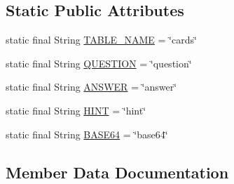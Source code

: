\subsection*{Static Public Attributes}
\begin{DoxyCompactItemize}
\item 
static final String \hyperlink{classorg_1_1buildmlearn_1_1learnwithflashcards_1_1data_1_1FlashContract_1_1FlashCards_a1df683e63de75b46348ae0f509f7b2eb}{T\+A\+B\+L\+E\+\_\+\+N\+A\+ME} = \char`\"{}cards\char`\"{}
\item 
static final String \hyperlink{classorg_1_1buildmlearn_1_1learnwithflashcards_1_1data_1_1FlashContract_1_1FlashCards_abe5a359cab3c3b1a89604497e645b1df}{Q\+U\+E\+S\+T\+I\+ON} = \char`\"{}question\char`\"{}
\item 
static final String \hyperlink{classorg_1_1buildmlearn_1_1learnwithflashcards_1_1data_1_1FlashContract_1_1FlashCards_a3d44587c144dfd28d7d6f1e5b98f499e}{A\+N\+S\+W\+ER} = \char`\"{}answer\char`\"{}
\item 
static final String \hyperlink{classorg_1_1buildmlearn_1_1learnwithflashcards_1_1data_1_1FlashContract_1_1FlashCards_a2c347ee6d0085d7eb67f6d3da8f98d1f}{H\+I\+NT} = \char`\"{}hint\char`\"{}
\item 
static final String \hyperlink{classorg_1_1buildmlearn_1_1learnwithflashcards_1_1data_1_1FlashContract_1_1FlashCards_a6cd60063a2f7adde90cd2d53ef4a35ca}{B\+A\+S\+E64} = \char`\"{}base64\char`\"{}
\end{DoxyCompactItemize}


\subsection{Member Data Documentation}
